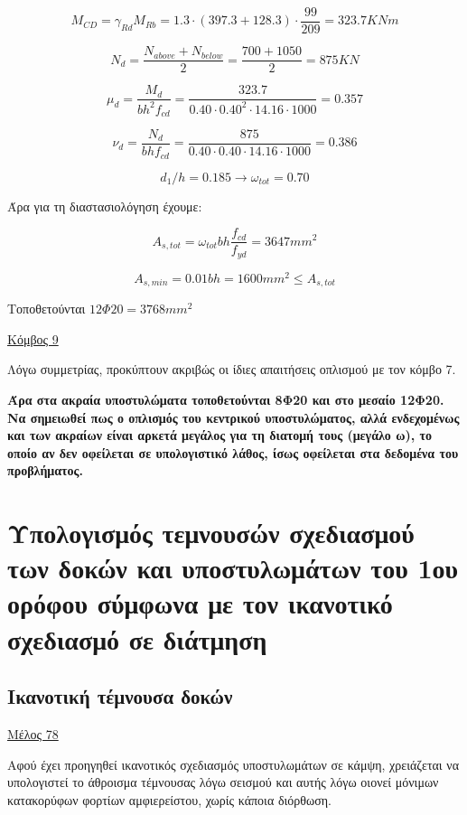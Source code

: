 \[
M_{CD}=\gamma_{Rd}M_{Rb} = 1.3\cdot(397.3+128.3)\cdot\dfrac{99}{209} =323.7 KNm 
\]

\[
N_d = \dfrac{N_{above}+N_{below}}{2}=\dfrac{700+1050}{2}=875 KN
\]

\[
\mu_d = \dfrac{M_d}{bh^2f_{cd}}=\dfrac{323.7}{0.40\cdot0.40^2\cdot14.16\cdot1000}=0.357
\]

\[
\nu_d = \dfrac{N_d}{bhf_{cd}}=\dfrac{875}{0.40\cdot0.40\cdot14.16\cdot1000}=0.386
\]

\[
d_1/h = 0.185 \rightarrow \omega_{tot}= 0.70
\]

\noindent
Άρα για τη διαστασιολόγηση έχουμε:

\[
A_{s,tot}=\omega_{tot} b h \dfrac{f_{cd}}{f_{yd}} = 3647 mm^2
\]

\[
A_{s,min}=0.01b h = 1600 mm^2 \leq A_{s,tot}
\]

\noindent
Τοποθετούνται $12\Phi20 = 3768 mm^2$

\bigskip

\noindent
\underline{Κόμβος 9}

\bigskip

\noindent
Λόγω συμμετρίας, προκύπτουν ακριβώς οι ίδιες απαιτήσεις οπλισμού με τον κόμβο 7.

\bigskip

\noindent\textbf{\textcolor{mygreen}{Άρα στα ακραία υποστυλώματα τοποθετούνται 8Φ20 και στο μεσαίο 12Φ20. Να σημειωθεί πως ο οπλισμός του κεντρικού υποστυλώματος, αλλά ενδεχομένως και των ακραίων είναι αρκετά μεγάλος για τη διατομή τους (μεγάλο ω), το οποίο αν δεν οφείλεται σε υπολογιστικό λάθος, ίσως οφείλεται στα δεδομένα του προβλήματος.}}

\section{Υπολογισμός τεμνουσών σχεδιασμού των δοκών και υποστυλωμάτων του 1ου ορόφου σύμφωνα με τον ικανοτικό σχεδιασμό σε διάτμηση}

\subsection{Ικανοτική τέμνουσα δοκών}
\noindent
\underline{Μέλος 78}

\bigskip

\noindent
Αφού έχει προηγηθεί ικανοτικός σχεδιασμός υποστυλωμάτων σε κάμψη, χρειάζεται να υπολογιστεί το άθροισμα τέμνουσας λόγω σεισμού και αυτής λόγω οιονεί μόνιμων κατακορύφων φορτίων αμφιερείστου, χωρίς κάποια διόρθωση.

